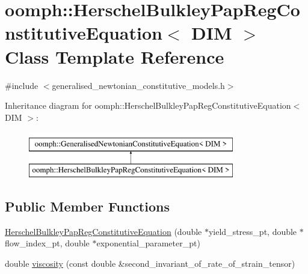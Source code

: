 \hypertarget{classoomph_1_1HerschelBulkleyPapRegConstitutiveEquation}{}\section{oomph\+:\+:Herschel\+Bulkley\+Pap\+Reg\+Constitutive\+Equation$<$ D\+IM $>$ Class Template Reference}
\label{classoomph_1_1HerschelBulkleyPapRegConstitutiveEquation}


{\ttfamily \#include $<$generalised\+\_\+newtonian\+\_\+constitutive\+\_\+models.\+h$>$}

Inheritance diagram for oomph\+:\+:Herschel\+Bulkley\+Pap\+Reg\+Constitutive\+Equation$<$ D\+IM $>$\+:\begin{figure}[H]
\begin{center}
\leavevmode
\includegraphics[height=2.000000cm]{classoomph_1_1HerschelBulkleyPapRegConstitutiveEquation}
\end{center}
\end{figure}
\subsection*{Public Member Functions}
\begin{DoxyCompactItemize}
\item 
\hyperlink{classoomph_1_1HerschelBulkleyPapRegConstitutiveEquation_a445a4a4c855676db922fd63c4574c4ad}{Herschel\+Bulkley\+Pap\+Reg\+Constitutive\+Equation} (double $\ast$yield\+\_\+stress\+\_\+pt, double $\ast$flow\+\_\+index\+\_\+pt, double $\ast$exponential\+\_\+parameter\+\_\+pt)
\item 
double \hyperlink{classoomph_1_1HerschelBulkleyPapRegConstitutiveEquation_a53c9a6dc6aea602726bd58e6f0875704}{viscosity} (const double \&second\+\_\+invariant\+\_\+of\+\_\+rate\+\_\+of\+\_\+strain\+\_\+tensor)
\end{DoxyCompactItemize}
